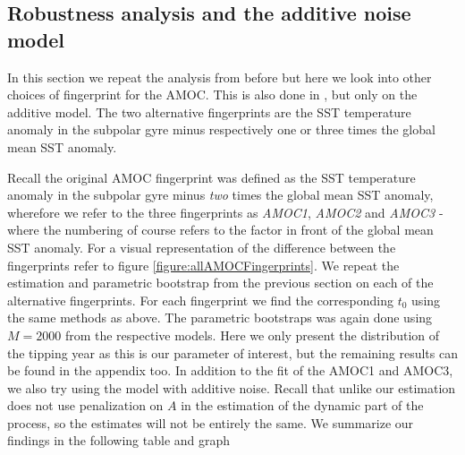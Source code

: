 \subsection{Robustness analysis and the additive noise model}
In this section we repeat the analysis from before but here we look into other choices of fingerprint for the AMOC. This is also done in \cite{Ditlevsen2023}, but only on the additive model. The two alternative fingerprints are the SST temperature anomaly in the subpolar gyre minus respectively one or three times the global mean SST anomaly.

Recall the original AMOC fingerprint was defined as the SST temperature anomaly in the subpolar gyre minus \textit{two} times the global mean SST anomaly, wherefore we refer to the three fingerprints as \textit{AMOC1}, \textit{AMOC2} and \textit{AMOC3} - where the numbering of course refers to the factor in front of the global mean SST anomaly. For a visual representation of the difference between the fingerprints refer to figure \ref{figure:allAMOCFingerprints}. We repeat the estimation and parametric bootstrap from the previous section on each of the alternative fingerprints. For each fingerprint we find the corresponding $t_0$ using the same methods as above. The parametric bootstraps was again done using $ M = 2000$ from the respective models. Here we only present the distribution of the tipping year as this is our parameter of interest, but the remaining results can be found in the appendix too. In addition to the fit of the AMOC1 and AMOC3, we also try using the model with additive noise. Recall that unlike \cite{Ditlevsen2023} our estimation does not use penalization on $A$ in the estimation of the dynamic part of the process, so the estimates will not be entirely the same. We summarize our findings in the following table and graph
